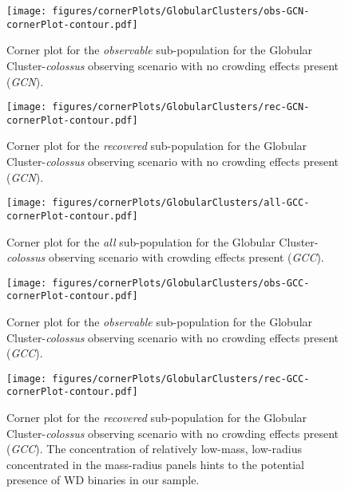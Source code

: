 \documentclass[twocolumn]{aastex63}
\begin{document}
\begin{figure}
    \centering
    \texttt{[image: figures/cornerPlots/GlobularClusters/obs-GCN-cornerPlot-contour.pdf]}
    \caption{Corner plot for the \textit{observable} sub-population for the Globular Cluster-\textit{colossus} observing scenario with no crowding effects present (\textit{GCN}).}
    \label{fig:gcn-Obs-corner-plot-appendix}
\end{figure}\clearpage

\begin{figure}
    \centering
    \texttt{[image: figures/cornerPlots/GlobularClusters/rec-GCN-cornerPlot-contour.pdf]}
    \caption{Corner plot for the \textit{recovered} sub-population for the Globular Cluster-\textit{colossus} observing scenario with no crowding effects present (\textit{GCN}).}
    \label{fig:gcn-Rec-corner-plot-appendix}
\end{figure}\clearpage

\begin{figure}
    \centering
    \texttt{[image: figures/cornerPlots/GlobularClusters/all-GCC-cornerPlot-contour.pdf]}
    \caption{Corner plot for the \textit{all} sub-population for the Globular Cluster-\textit{colossus} observing scenario with crowding effects present (\textit{GCC}).}
    \label{fig:gcc-all-corner-plot-appendix}
\end{figure}\clearpage

\begin{figure}
    \centering
    \texttt{[image: figures/cornerPlots/GlobularClusters/obs-GCC-cornerPlot-contour.pdf]}
    \caption{Corner plot for the \textit{observable} sub-population for the Globular Cluster-\textit{colossus} observing scenario with no crowding effects present (\textit{GCC}).}
    \label{fig:gcn-obs-corner-plot-appendix}
\end{figure}\clearpage

\begin{figure}
    \centering
    \texttt{[image: figures/cornerPlots/GlobularClusters/rec-GCC-cornerPlot-contour.pdf]}
    \caption{Corner plot for the \textit{recovered} sub-population for the Globular Cluster-\textit{colossus} observing scenario with no crowding effects present (\textit{GCC}). The concentration of relatively low-mass, low-radius concentrated in the mass-radius panels hints to the potential presence of WD binaries in our sample.}
    \label{fig:gcc-rec-corner-plot-appendix}
\end{figure}\clearpage
\end{document}
